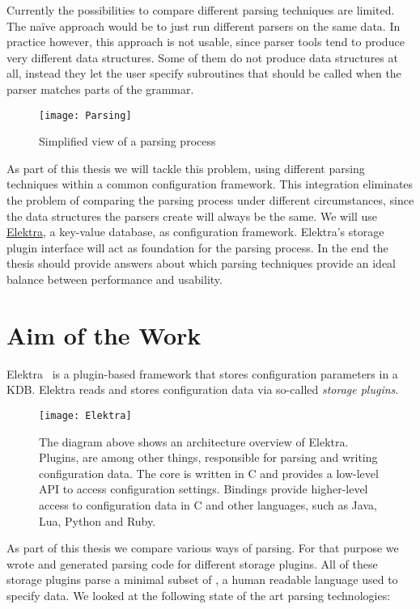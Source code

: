 Currently the possibilities to compare different parsing techniques are limited. The naïve approach would be to just run different parsers on the same data. In practice however, this approach is not usable, since parser tools tend to produce very different data structures. Some of them do not produce data structures at all, instead they let the user specify subroutines that should be called when the parser matches parts of the grammar.

\begin{figure}[H]
  \centering
    \texttt{[image: Parsing]}
  \caption{Simplified view of a parsing process}
\end{figure}

As part of this thesis we will tackle this problem, using different parsing techniques within a common configuration framework. This integration eliminates the problem of comparing the parsing process under different circumstances, since the data structures the parsers create will always be the same. We will use \href{https://libelektra.org}{Elektra}, a key-value database, as configuration framework. Elektra’s storage plugin interface will act as foundation for the parsing process. In the end the thesis should provide answers about which parsing techniques provide an ideal balance between performance and usability.

\section{Aim of the Work}
\label{sec:aim_of_the_work}

Elektra~\cite{raab2010modular, raab2017context} is a plugin-based framework that stores configuration parameters in a \gls{KDB}. Elektra reads and stores configuration data via so-called \emph{storage plugins}.

\begin{figure}[H]
  \centering
    \texttt{[image: Elektra]}
  \caption{The diagram above shows an architecture overview of Elektra. Plugins, are among other things, responsible for parsing and writing configuration data. The core is written in C and provides a low-level \gls{API} to access configuration settings. Bindings provide higher-level access to configuration data in C and other languages, such as Java, Lua, Python and Ruby.}
\end{figure}

As part of this thesis we compare various ways of parsing. For that purpose we wrote and generated parsing code for different storage plugins. All of these storage plugins parse a minimal subset of , a human readable language used to specify data. We looked at the following state of the art parsing technologies:

